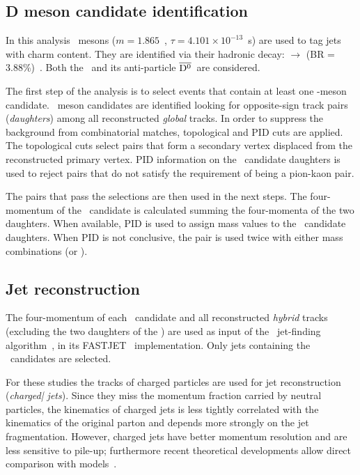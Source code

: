 \documentclass[a4paper]{jpconf}
\begin{document}
\subsection{D meson candidate identification}
In this analysis \Dzero\ mesons ($m=1.865$~\GeVcsq, $\tau=4.101 \times 10^{-13}$~s) are used to tag jets with charm content.
They are identified via their hadronic decay: \Dzero $\rightarrow$ \pip \kam (BR = 3.88\%)~\cite{PDG:2014}. Both the \Dzero\ and its
anti-particle $\overline{\mathrm{D^{0}}}$~are considered.

The first step of the analysis is to select events that contain at least one \Dzero-meson candidate.
\Dzero\ meson candidates are identified looking for opposite-sign track pairs (\emph{daughters}) among all reconstructed \emph{global} tracks.
In order to suppress the background from combinatorial matches, topological and PID cuts are applied.
The topological cuts select pairs that form a secondary vertex displaced from the reconstructed
primary vertex. 
PID information on the \Dzero\ candidate daughters is used to reject pairs that do not satisfy the requirement of being a pion-kaon pair.

The pairs that pass the selections are then used in the next steps.
The four-momentum of the \Dzero\ candidate is calculated summing the four-momenta of the two daughters.
When available, PID is used to assign mass values to the \Dzero\ candidate daughters. When PID is not conclusive,
the pair is used twice with either mass combinations (\pip \kam or \pim \kap). 

\subsection{Jet reconstruction}
The four-momentum of each \Dzero\ candidate and all reconstructed \emph{hybrid} tracks
(excluding the two daughters of the \Dzero) are used as input of the \antikt\ jet-finding algorithm~\cite{Cacciari:2008c},
in its FASTJET~\cite{Cacciari:2012} implementation. Only jets containing the \Dzero\ candidates are selected.

For these studies the tracks of charged particles are used for jet reconstruction (\emph{charged| jets}). Since they miss the momentum
fraction carried by neutral particles, the kinematics of charged jets is less tightly correlated with the kinematics
of the original parton and depends more strongly on the jet fragmentation. However, charged jets have better momentum resolution
and are less sensitive to pile-up; furthermore recent theoretical developments allow direct comparison with models~\cite{Thaler:2013}.
\end{document}
